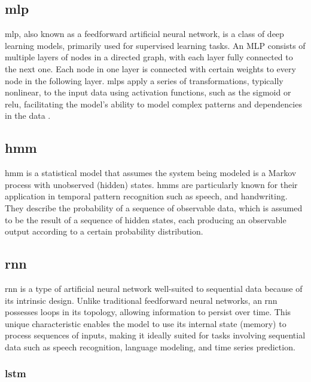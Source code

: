 \subsection{\ac{mlp}}

\ac{mlp}, also known as a feedforward artificial neural network, is a class of deep learning models, primarily used for supervised learning tasks.
An MLP consists of multiple layers of nodes in a directed graph, with each layer fully connected to the next one.
Each node in one layer is connected with certain weights to every node in the following layer.
\acp{mlp} apply a series of transformations, typically nonlinear, to the input data using activation functions, such as the sigmoid or \ac{relu}, facilitating the model's ability to model complex patterns and dependencies in the data \cite{goodfellow_deep_2016}.

\subsection{\ac{hmm}}

\ac{hmm} is a statistical model that assumes the system being modeled is a Markov process with unobserved (hidden) states\cite{hmm-rabiner-1989}.
\acp{hmm} are particularly known for their application in temporal pattern recognition such as speech, and handwriting.
They describe the probability of a sequence of observable data, which is assumed to be the result of a sequence of hidden states, each producing an observable output according to a certain probability distribution.

\subsection{\ac{rnn}}

\ac{rnn} is a type of artificial neural network well-suited to sequential data because of its intrinsic design.
Unlike traditional feedforward neural networks, an \ac{rnn} possesses loops in its topology, allowing information to persist over time.
This unique characteristic enables the model to use its internal state (memory) to process sequences of inputs, making it ideally suited for tasks involving sequential data such as speech recognition, language modeling, and time series prediction\cite{elman_finding_1990}.

\subsubsection{\ac{lstm}}

